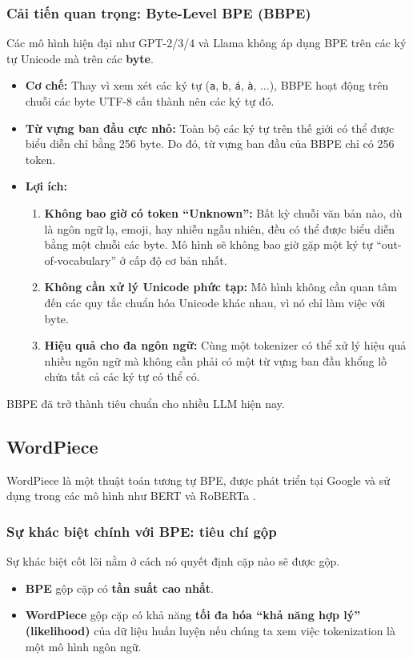 \subsubsection{Cải tiến quan trọng: Byte-Level BPE (BBPE)}
Các mô hình hiện đại như GPT-2/3/4 và Llama không áp dụng BPE trên các ký tự Unicode mà trên các \textbf{byte}.
\begin{itemize}
    \item \textbf{Cơ chế:} Thay vì xem xét các ký tự (\texttt{a}, \texttt{b}, \texttt{á}, \texttt{à}, ...), BBPE hoạt động trên chuỗi các byte UTF-8 cấu thành nên các ký tự đó.
    \item \textbf{Từ vựng ban đầu cực nhỏ:} Toàn bộ các ký tự trên thế giới có thể được biểu diễn chỉ bằng 256 byte. Do đó, từ vựng ban đầu của BBPE chỉ có 256 token.
    \item \textbf{Lợi ích:}
        \begin{enumerate}
            \item \textbf{Không bao giờ có token “Unknown”:} Bất kỳ chuỗi văn bản nào, dù là ngôn ngữ lạ, emoji, hay nhiễu ngẫu nhiên, đều có thể được biểu diễn bằng một chuỗi các byte. Mô hình sẽ không bao giờ gặp một ký tự “out-of-vocabulary” ở cấp độ cơ bản nhất.
            \item \textbf{Không cần xử lý Unicode phức tạp:} Mô hình không cần quan tâm đến các quy tắc chuẩn hóa Unicode khác nhau, vì nó chỉ làm việc với byte.
            \item \textbf{Hiệu quả cho đa ngôn ngữ:} Cùng một tokenizer có thể xử lý hiệu quả nhiều ngôn ngữ mà không cần phải có một từ vựng ban đầu khổng lồ chứa tất cả các ký tự có thể có.
        \end{enumerate}
\end{itemize}
BBPE đã trở thành tiêu chuẩn cho nhiều LLM hiện nay.
\subsection{WordPiece}
\label{ssec:wordpiece}

WordPiece là một thuật toán tương tự BPE, được phát triển tại Google và sử dụng trong các mô hình như BERT và RoBERTa \cite{wu2016google}.

\subsubsection{Sự khác biệt chính với BPE: tiêu chí gộp}
Sự khác biệt cốt lõi nằm ở cách nó quyết định cặp nào sẽ được gộp.
\begin{itemize}
    \item \textbf{BPE} gộp cặp có \textbf{tần suất cao nhất}.
    \item \textbf{WordPiece} gộp cặp có khả năng \textbf{tối đa hóa “khả năng hợp lý” (likelihood)} của dữ liệu huấn luyện nếu chúng ta xem việc tokenization là một mô hình ngôn ngữ.
\end{itemize}

